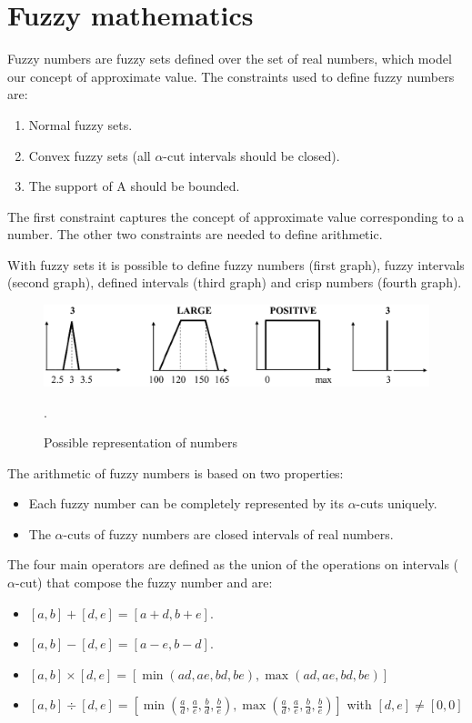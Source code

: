 \documentclass[12pt, a4paper]{report}
\newtheorem[style=M,bodystyle=\normalfont]{theorem}{Theorem}
\newtheorem[style=M,bodystyle=\normalfont]{corollary}{Corollary}
\newtheorem[style=M,bodystyle=\normalfont]{lemma}{Lemma}
\newtheorem[style=M,bodystyle=\normalfont]{definition}{Definition}
\begin{document}
    \section{Fuzzy mathematics}
    Fuzzy numbers are fuzzy sets defined over the set of real numbers, which model our concept of approximate value. The constraints used to 
    define fuzzy numbers are: 
    \begin{enumerate}
        \item Normal fuzzy sets.
        \item Convex fuzzy sets (all $\alpha$-cut intervals should be closed).
        \item The support of A should be bounded. 
    \end{enumerate}
    The first constraint captures the concept of approximate value corresponding to a number. The other two constraints are needed to define 
    arithmetic. 

    With fuzzy sets it is possible to define fuzzy numbers (first graph), fuzzy intervals (second graph), defined intervals (third graph) and 
    crisp numbers (fourth graph). 
    \begin{figure}[H]
        \centering
        \includegraphics[width=0.75\linewidth]{images/numbers.png}
        \caption{Possible representation of numbers}.
    \end{figure}

    The arithmetic of fuzzy numbers is based on two properties:
    \begin{itemize}
        \item Each fuzzy number can be completely represented by its $\alpha$-cuts uniquely. 
        \item The $\alpha$-cuts of fuzzy numbers are closed intervals of real numbers. 
    \end{itemize}

    The four main operators are defined as the union of the operations on intervals ($\alpha$-cut) that compose the fuzzy number and are: 
    \begin{itemize}
        \item $[a,b]+[d,e]=[a+d,b+e]$.
        \item $[a,b]-[d,e]=[a-e,b-d]$.
        \item $[a,b] \times [d,e]=[\min (ad,ae,bd,be),\max (ad,ae,bd,be)]$
        \item $[a,b] \div [d,e]=[\min (\frac{a}{d},\frac{a}{e},\frac{b}{d},\frac{b}{e}),\max (\frac{a}{d},\frac{a}{e},\frac{b}{d},\frac{b}{e})]$ with $[d,e] \neq [0,0]$
    \end{itemize}
\end{document}
